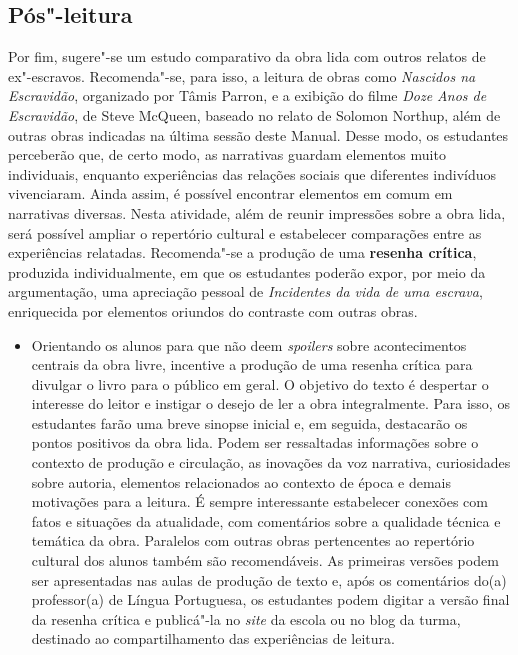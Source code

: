 \documentclass[12pt]{extarticle}
\begin{document}
\subsection{Pós"-leitura}

\bnccativividadesposleitura

Por fim, sugere"-se um estudo comparativo da obra lida com
outros relatos de ex"-escravos. Recomenda"-se, para isso, a leitura de
obras como \emph{Nascidos na Escravidão}, organizado por Tâmis Parron, e
a exibição do filme \emph{Doze Anos de Escravidão}, de Steve McQueen,
baseado no relato de Solomon Northup, além de outras obras indicadas na
última sessão deste Manual. Desse modo, os estudantes perceberão que, de
certo modo, as narrativas guardam elementos muito individuais, enquanto
experiências das relações sociais que diferentes indivíduos vivenciaram.
Ainda assim, é possível encontrar elementos em comum em narrativas
diversas. Nesta atividade, além de reunir impressões sobre a obra lida,
será possível ampliar o repertório cultural e estabelecer comparações
entre as experiências relatadas. Recomenda"-se a produção de uma
\textbf{resenha crítica}, produzida individualmente, em que os
estudantes poderão expor, por meio da argumentação, uma apreciação
pessoal de \emph{Incidentes da vida de uma escrava}, enriquecida por
elementos oriundos do contraste com outras obras.

\begin{itemize}
\item
  Orientando os alunos para que não deem \emph{spoilers} sobre
  acontecimentos centrais da obra livre, incentive a produção de uma
  resenha crítica para divulgar o livro para o público em geral. O
  objetivo do texto é despertar o interesse do leitor e instigar o
  desejo de ler a obra integralmente. Para isso, os estudantes farão uma
  breve sinopse inicial e, em seguida, destacarão os pontos positivos da
  obra lida. Podem ser ressaltadas informações sobre o contexto de
  produção e circulação, as inovações da voz narrativa, curiosidades
  sobre autoria, elementos relacionados ao contexto de época e demais
  motivações para a leitura. É sempre interessante estabelecer conexões
  com fatos e situações da atualidade, com comentários sobre a qualidade
  técnica e temática da obra. Paralelos com outras obras pertencentes ao
  repertório cultural dos alunos também são recomendáveis. As primeiras
  versões podem ser apresentadas nas aulas de produção de texto e, após
  os comentários do(a) professor(a) de Língua Portuguesa, os estudantes
  podem digitar a versão final da resenha crítica e publicá"-la no
  \emph{site} da escola ou no blog da turma, destinado ao
  compartilhamento das experiências de leitura.
\end{itemize}
\end{document}
